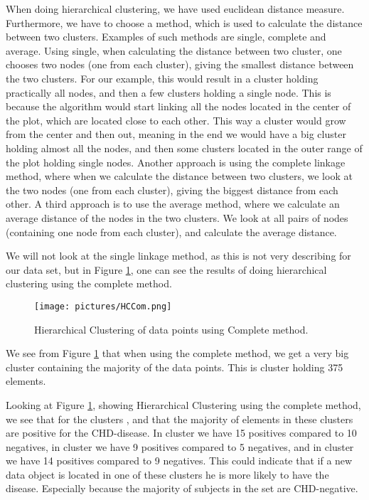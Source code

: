 When doing hierarchical clustering, we have used euclidean distance measure. Furthermore, we have to choose a method, which is used to calculate the distance between two clusters. Examples of such methods are single, complete and average. Using single, when calculating the distance between two cluster, one chooses two nodes (one from each cluster), giving the smallest distance between the two clusters. For our example, this would result in a cluster holding practically all nodes, and then a few clusters holding a single node.  This is because the algorithm would start linking all the nodes located in the center of the plot, which are located close to each other. This way a cluster would grow from the center and then out, meaning in the end we would have a big cluster holding almost all the nodes, and then some clusters located in the outer range of the plot holding single nodes. Another approach is using the complete linkage method, where when we calculate the distance between two clusters, we look at the two nodes (one from each cluster), giving the biggest distance from each other. A third approach is to use the average method, where we calculate an average distance of the nodes in the two clusters. We look at all pairs of nodes (containing one node from each cluster), and calculate the average distance.

We will not look at the single linkage method, as this is not very describing for our data set, but in Figure \ref{HCResultsCOM}, one can see the results of doing hierarchical clustering using the complete method.

\begin{figure}[H]
\texttt{[image: pictures/HCCom.png]}
\caption{\footnotesize Hierarchical Clustering of data points using Complete method.}
\label{HCResultsCOM}
\end{figure}

We see from Figure \ref{HCResultsCOM} that when using the complete method, we get a very big cluster containing the majority of the data points. This is cluster \HCCOMD{}  holding 375 elements.

Looking at Figure \ref{HCResultsCOM}, showing Hierarchical Clustering using the complete method, we see that for the clusters \HCCOMA{}, \HCCOMB{} and \HCCOMC{} that the majority of elements in these clusters are positive for the CHD-disease. In cluster \HCCOMA{} we have 15 positives compared to 10 negatives, in cluster \HCCOMB{} we have 9 positives compared to 5 negatives, and in cluster \HCCOMC{} we have 14 positives compared to 9 negatives. This could indicate that if a new data object is located in one of these clusters he is more likely to have the disease. Especially because the majority of subjects in the set are CHD-negative.


